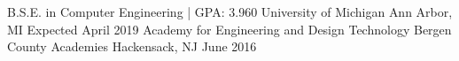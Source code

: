 \begin{cventries}
  \educationEntry
    {B.S.E. in Computer Engineering | GPA: 3.960} 		{University of Michigan}
    {Ann Arbor, MI}
    {Expected April 2019}
    {}
  \educationEntry
    {Academy for Engineering and Design Technology}
    {Bergen County Academies}
    {Hackensack, NJ}
    {June 2016}
    {}
\end{cventries}